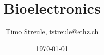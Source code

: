 \documentclass[%
,a4paper
,fontsize=8.6pt
,landscape
,pagesize
,headinclude
]{scrartcl}
\title{Bioelectronics}
\author{Timo Streule, tstreule@ethz.ch}
\date{\today}
\begin{document}
	

	\begin{multicols*}{3}


		\maketitle

		
		
		
		
		
		
		
		
		
		
		
		

	\end{multicols*}
\end{document}
